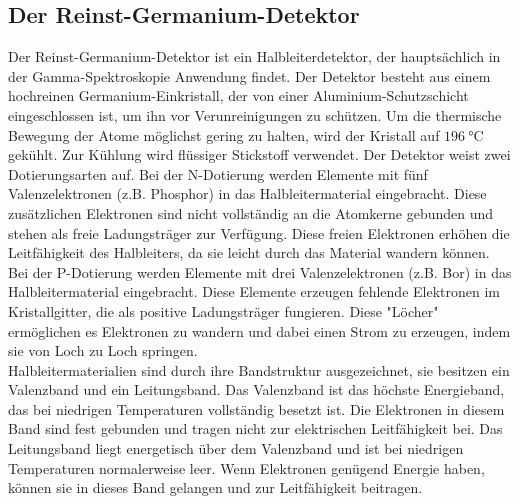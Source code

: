 \subsection{Der Reinst-Germanium-Detektor}
Der Reinst-Germanium-Detektor ist ein Halbleiterdetektor, der hauptsächlich in der Gamma-Spektroskopie Anwendung findet. Der Detektor besteht aus
einem hochreinen Germanium-Einkristall, der von einer Aluminium-Schutzschicht eingeschlossen ist, um ihn vor Verunreinigungen zu schützen. Um die 
thermische Bewegung der Atome möglichst gering zu halten, wird der Kristall auf $\qty{196}{\celsius}$ gekühlt. Zur Kühlung wird flüssiger Stickstoff verwendet.
Der Detektor weist zwei Dotierungsarten auf.
Bei der N-Dotierung werden Elemente mit fünf Valenzelektronen (z.B. Phosphor) in das Halbleitermaterial eingebracht. 
Diese zusätzlichen Elektronen sind nicht vollständig an die Atomkerne gebunden und stehen als freie Ladungsträger zur Verfügung. Diese freien Elektronen
erhöhen die Leitfähigkeit des Halbleiters, da sie leicht durch das Material wandern können.\\
Bei der P-Dotierung werden Elemente mit drei Valenzelektronen (z.B. Bor) in das Halbleitermaterial eingebracht.
Diese Elemente erzeugen fehlende Elektronen im Kristallgitter, die als positive Ladungsträger fungieren. Diese "Löcher" ermöglichen es Elektronen
zu wandern und dabei einen Strom zu erzeugen, indem sie von Loch zu Loch springen.\\
Halbleitermaterialien sind durch ihre Bandstruktur ausgezeichnet, sie besitzen ein Valenzband und ein Leitungsband.
Das Valenzband ist das höchste Energieband, das bei niedrigen Temperaturen vollständig besetzt ist. Die Elektronen in diesem Band sind fest
gebunden und tragen nicht zur elektrischen Leitfähigkeit bei. Das Leitungsband liegt energetisch über dem Valenzband und ist bei niedrigen Temperaturen 
normalerweise leer. Wenn Elektronen genügend Energie haben, können sie in dieses Band gelangen und zur Leitfähigkeit beitragen.


